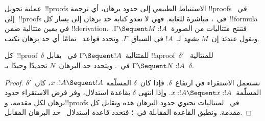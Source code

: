 \documentclass[../../../include/open-logic-section]{subfiles}
\begin{document}


عملية تحويل~!!{proof}s الاستنباط الطبيعي إلى حدود برهان، أي ترجمة
!!{proof}s في~ إلى~!!{proof}s في~، مباشرة للغاية. فهي
لا تعدو كتابة حد برهان إلى يسار كل~!!{formula} في يمين متتالية ضمن
!!{derivation}، فتنتج متتاليات من الصورة~$\Gamma\Sequent M:!A$. ونقول عندئذ
إن~$M$ \emph{يشهد} لـ~$!A$ في السياق~$\Gamma$. وتحدد قواعد~
تمامًا أي حد برهان نكتب.

\begin{prop}
كل~!!{proof}~$\delta$ للمتتالية~$\Gamma\Sequent !A$ في~ يقابل
!!a{proof}~$\delta'$ للمتتالية~$\Gamma\Sequent N:!A$ في~.
ويتحدد حد البرهان~$N$ تحديدًا وحيدًا بـ~$\delta$.
\end{prop}

\begin{proof}
نستعمل الاستقراء في ارتفاع~$\delta$. فإذا كان~$\delta$ المسلّمة
$x:!A\Sequent !A$، كان~$\delta'$ المسلّمة~$x:!A\Sequent x:!A$. وإذا انتهى
$\delta$ بقاعدة استدلال، وفر فرض الاستقراء حدود برهان لكل مقدمة، و!!{proof}s
في~ لمتتاليات تحتوي حدود البرهان هذه وتقابل كل مقدمة. ونطبق
القاعدة المقابلة في~؛ فتحدد قاعدة استدلال~ حد البرهان
المقابل.
\end{proof}
\end{document}
